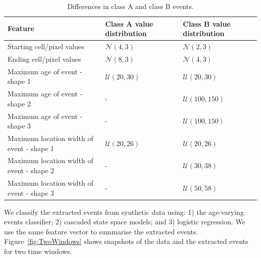 \documentclass[a4paper,11pt]{article}
\begin{document}
\begin{table}[!ht]
	\centering
	\begin{tabular}{lll}
		\toprule
    Feature                                   & Class A value distribution & Class B value distribution \\
		\midrule
    Starting cell/pixel values                & $\mathcal{N}(4,3)$         & $\mathcal{N}(2, 3)$                  \\
    Ending cell/pixel values                  & $\mathcal{N}(8,3)$         & $\mathcal{N}(4, 3)$                  \\
    Maximum age of event - shape 1            & $\mathcal{U}(20,30)$       & $\mathcal{U}(20,30)$                 \\
    Maximum age of event - shape 2            & -                          & $\mathcal{U}(100,150)$               \\
    Maximum age of event - shape 3            & -                          & $\mathcal{U}(100,150)$               \\
    Maximum location width of event - shape 1 & $\mathcal{U}(20,26)$       & $\mathcal{U}(20,26)$                 \\
    Maximum location width of event - shape 2 & -                          & $\mathcal{U}(30,38)$                 \\
    Maximum location width of event - shape 3 & -                          & $\mathcal{U}(50,58)$                 \\
		\bottomrule
	\end{tabular}
	 \caption{Differences in class A and class B events.}\label{tab:DiffClassAandB}
\end{table}

We classify the extracted events from synthetic data using: 1) the age-varying events classifier; 2) cascaded state space models; and 3) logistic regression. We use the same feature vector to summarise the extracted events. Figure~\ref{fig:TwoWindows} shows snapshots of the data and the extracted events for two time windows.
\end{document}
